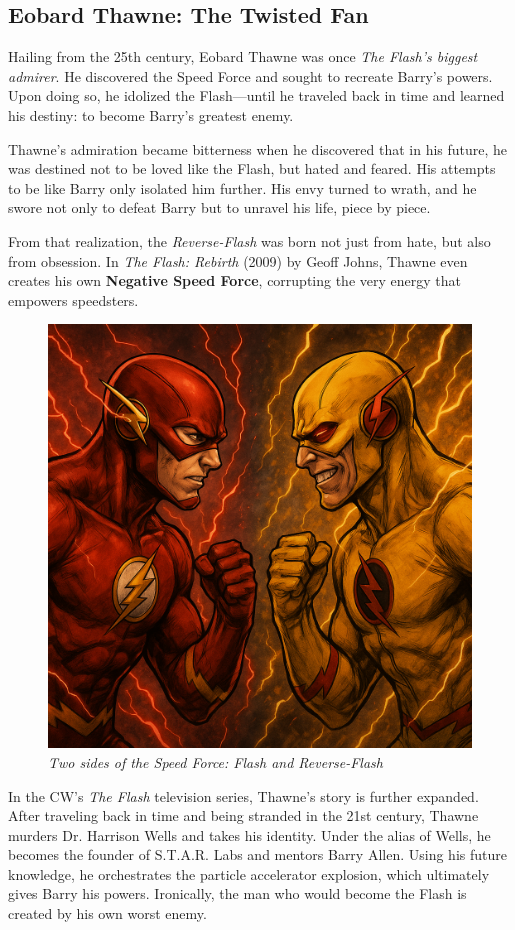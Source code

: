\documentclass[a4paper,10pt,twocolumn]{memoir}
\begin{document}
\subsection*{Eobard Thawne: The Twisted Fan}
Hailing from the 25th century, Eobard Thawne was once \textit{The Flash’s biggest admirer}. He discovered the Speed Force and sought to recreate Barry’s powers. Upon doing so, he idolized the Flash---until he traveled back in time and learned his destiny: to become Barry’s greatest enemy.

Thawne’s admiration became bitterness when he discovered that in his future, he was destined not to be loved like the Flash, but hated and feared. His attempts to be like Barry only isolated him further. His envy turned to wrath, and he swore not only to defeat Barry but to unravel his life, piece by piece.

From that realization, the \textit{Reverse-Flash} was born not just from hate, but also from obsession. In \textit{The Flash: Rebirth} (2009) by Geoff Johns, Thawne even creates his own \textbf{Negative Speed Force}, corrupting the very energy that empowers speedsters.

\begin{figure}[h!]
  \centering
  \includegraphics[width=0.9\linewidth]{vs.png}
  \caption*{\textit{Two sides of the Speed Force: Flash and Reverse-Flash}}
\end{figure}

In the CW's \textit{The Flash} television series, Thawne’s story is further expanded. After traveling back in time and being stranded in the 21st century, Thawne murders Dr. Harrison Wells and takes his identity. Under the alias of Wells, he becomes the founder of S.T.A.R. Labs and mentors Barry Allen. Using his future knowledge, he orchestrates the particle accelerator explosion, which ultimately gives Barry his powers. Ironically, the man who would become the Flash is created by his own worst enemy.
\end{document}

